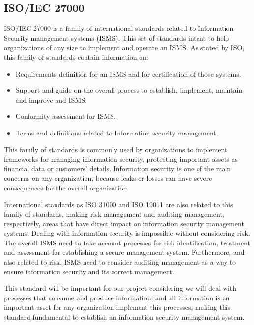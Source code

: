\subsection{ISO/IEC 27000}

ISO/IEC 27000\cite{ISO27000} is a family of international standards related to Information Security management systems (ISMS). This set of standards intent to help organizations of any size to implement and operate an ISMS. As stated by ISO, this family of standards contain information on:

\begin{itemize}

\item Requirements definition for an ISMS and for certification of those systems.
\item Support and guide on the overall process to establish, implement, maintain and improve and ISMS.
\item Conformity assessment for ISMS.
\item Terms and definitions related to Information security management.

\end{itemize}

This family of standards is commonly used by organizations to implement frameworks for managing information security, protecting important assets as financial data or customers' details. Information security is one of the main concerns on any organization, because leaks or losses can have severe consequences for the overall organization.\par
International standards as ISO 31000 and ISO 19011 are also related to this family of standards, making risk management and auditing management, respectively, areas that have direct impact on information security management systems. Dealing with information security is impossible without considering risk. The overall ISMS need to take account processes for risk identification, treatment and assessment for establishing a secure management system. Furthermore, and also related to risk, ISMS need to consider auditing management as a way to ensure information security and its correct management.\par
This standard will be important for our project considering we will deal with processes that consume and produce information, and all information is an important asset for any organization implement this processes, making this standard fundamental to establish an information security management system.\par



